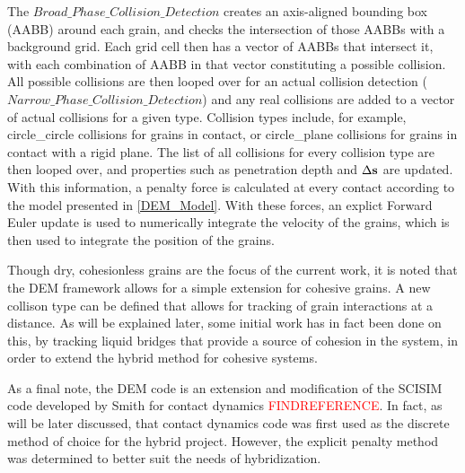 The $Broad\_Phase\_Collision\_Detection$ creates an axis-aligned bounding box (AABB) around each grain, and checks the intersection of those AABBs with a background grid. Each grid cell then has a vector of AABBs that intersect it, with each combination of AABB in that vector constituting a possible collision. All possible collisions are then looped over for an actual collision detection ($Narrow\_Phase\_Collision\_Detection$) and any real collisions are added to a vector of actual collisions for a given type. Collision types include, for example, circle\_circle collisions for grains in contact, or circle\_plane collisions for grains in contact with a rigid plane. The list of all collisions for every collision type are then looped over, and properties such as penetration depth and $\Delta\bold{s}$ are updated. With this information, a penalty force is calculated at every contact according to the model presented in \ref{DEM_Model}. With these forces, an explict Forward Euler update is used to numerically integrate the velocity of the grains, which is then used to integrate the position of the grains.

Though dry, cohesionless grains are the focus of the current work, it is noted that the DEM framework allows for a simple extension for cohesive grains. A new collison type can be defined that allows for tracking of grain interactions at a distance. As will be explained later, some initial work has in fact been done on this, by tracking liquid bridges that provide a source of cohesion in the system, in order to extend the hybrid method for cohesive systems.

As a final note, the DEM code is an extension and modification of the SCISIM code developed by Smith for contact dynamics \textcolor{red}{FINDREFERENCE}. In fact, as will be later discussed, that contact dynamics code was first used as the discrete method of choice for the hybrid project. However, the explicit penalty method was determined to better suit the needs of hybridization.